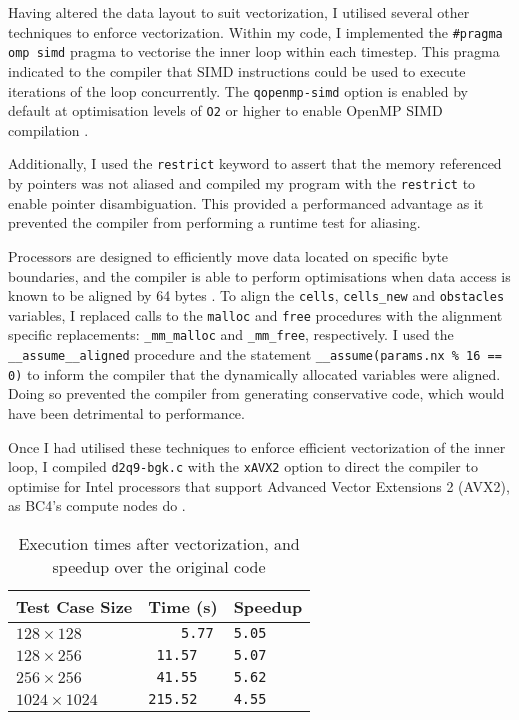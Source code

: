 \documentclass[11pt, twocolumn, a4paper]{article}
\begin{document}
Having altered the data layout to suit vectorization, I utilised several other techniques to enforce vectorization.
Within my code, I implemented the \texttt{\#pragma omp simd} pragma to vectorise the inner loop within each timestep.
This pragma indicated to the compiler that SIMD instructions could be used to execute iterations of the loop concurrently.
The \texttt{qopenmp-simd} option is enabled by default at optimisation levels of \texttt{O2} or higher to enable OpenMP SIMD compilation \cite{icc}.

Additionally, I used the \texttt{restrict} keyword to assert that the memory referenced by pointers was not aliased and compiled my program with the \texttt{restrict} to enable pointer disambiguation.
This provided a performanced advantage as it prevented the compiler from performing a runtime test for aliasing.

Processors are designed to efficiently move data located on specific byte boundaries, and the compiler is able to perform optimisations when data access is known to be aligned by 64 bytes \cite{alignment}.
To align the \texttt{cells}, \texttt{cells\_new} and \texttt{obstacles} variables, I replaced calls to the \texttt{malloc} and \texttt{free} procedures with the alignment specific replacements: \texttt{\_mm\_malloc} and \texttt{\_mm\_free}, respectively.
I used the \texttt{\_\_assume\_\_aligned} procedure and  the statement \texttt{\_\_assume(params.nx \% 16 == 0)} to inform the compiler that the dynamically allocated variables were aligned.
Doing so prevented the compiler from generating conservative code, which would have been detrimental to performance.

Once I had utilised these techniques to enforce efficient vectorization of the inner loop, I compiled \texttt{d2q9-bgk.c} with the \texttt{xAVX2} option to direct the compiler to optimise for Intel processors that support Advanced Vector Extensions 2 (AVX2), as BC4's compute nodes do \cite{lenovo}.

\begin{table}[htbp]
  \begin{center}
  \caption{Execution times after vectorization, and speedup over the original code}\label{tab:vectorized}
  \begin{tabular}{l | l l} 
      \hline\hline
      Test Case Size&Time (s)&Speedup\\
      \hline
      $128 \times 128$&\texttt{  \,\,\,5.77}&\texttt{5.05}\\
      $128 \times 256$&\texttt{ 11.57}&\texttt{5.07}\\
      $256 \times 256$&\texttt{ 41.55}&\texttt{5.62}\\
      $1024 \times 1024$&\texttt{215.52}&\texttt{4.55}\\
      \hline
    \end{tabular}
  \end{center}
\end{table}
\end{document}
